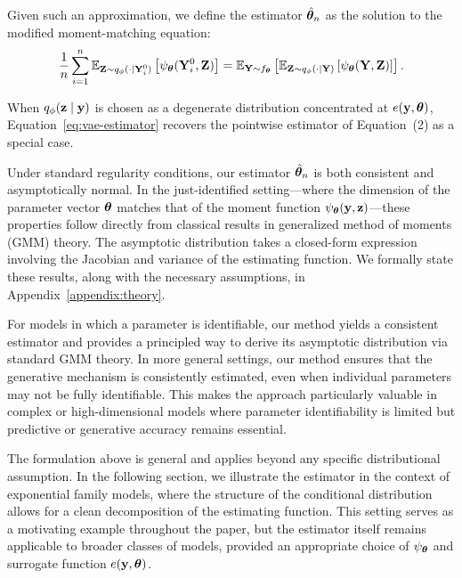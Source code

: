\documentclass[twoside,11pt]{article}
\begin{document}
{Given such an approximation, we define the estimator \( \hat{{\bm{\theta}}}_n \) as the solution to the modified moment-matching equation:
\begin{equation}
\label{eq:vae-estimator}
\frac{1}{n} \sum_{i=1}^n \mathbb{E}_{{\bf Z} \sim q_\phi(\cdot \mid {\bf Y}_i^0)} \left[ \psi_{\bm{\theta}}({\bf Y}_i^0, {\bf Z}) \right]
=
\mathbb{E}_{{\bf Y} \sim f_{\bm{\theta}}}
\left[
\mathbb{E}_{{\bf Z} \sim q_\phi(\cdot \mid {\bf Y})} 
\left[ 
\psi_{\bm{\theta}}({\bf Y}, {\bf Z})
\right]
\right].
\end{equation}

When \( q_\phi({\bf z} \mid {\bf y}) \) is chosen as a degenerate distribution concentrated at \( e({\bf y}, {\bm{\theta}}) \), Equation~\eqref{eq:vae-estimator} recovers the pointwise estimator of Equation~(2) as a special case.





Under standard regularity conditions, our estimator $\hat{{\bm{\theta}}}_n$ is both consistent and asymptotically normal. In the just-identified setting—where the dimension of the parameter vector ${\bm{\theta}}$ matches that of the moment function $\psi_{\bm{\theta}}({\bf y}, {\bf z})$—these properties follow directly from classical results in generalized method of moments (GMM) theory. The asymptotic distribution takes a closed-form expression involving the Jacobian and variance of the estimating function. We formally state these results, along with the necessary assumptions, in Appendix~\ref{appendix:theory}.

For models in which a parameter is identifiable, our method yields a consistent estimator and provides a principled way to derive its asymptotic distribution via standard GMM theory. In more general settings, our method ensures that the generative mechanism is consistently estimated, even when individual parameters may not be fully identifiable. This makes the approach particularly valuable in complex or high-dimensional models where parameter identifiability is limited but predictive or generative accuracy remains essential.


The formulation above is general and applies beyond any specific distributional assumption. In the following section, we illustrate the estimator in the context of exponential family models, where the structure of the conditional distribution allows for a clean decomposition of the estimating function. This setting serves as a motivating example throughout the paper, but the estimator itself remains applicable to broader classes of models, provided an appropriate choice of $\psi_{\bm{\theta}}$ and surrogate function $e({\bf y}, {\bm{\theta}})$.

}
\end{document}

